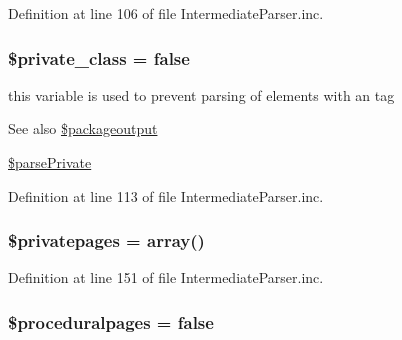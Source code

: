 \-Definition at line 106 of file \-Intermediate\-Parser.\-inc.

\hypertarget{classphp_documentor___intermediate_parser_a91bc6a84d69355cf5bf3fcae3d97df26}{
\subsubsection[{\$private\-\_\-class}]{\setlength{\rightskip}{0pt plus 5cm}\$private\-\_\-class = false}}\label{classphp_documentor___intermediate_parser_a91bc6a84d69355cf5bf3fcae3d97df26}
this variable is used to prevent parsing of elements with an  tag \begin{DoxySeeAlso}{\-See also}
\hyperlink{classphp_documentor___intermediate_parser_ae42e8e1aebbb7e9af6f8b463703e90a0}{\$packageoutput} 

\hyperlink{classphp_documentor___intermediate_parser_a351b7c7ced5d5cd6ce87029cca64d150}{\$parse\-Private} 
\end{DoxySeeAlso}


\-Definition at line 113 of file \-Intermediate\-Parser.\-inc.

\hypertarget{classphp_documentor___intermediate_parser_aca2dbbdf74f1847e4e2be72be9f5130e}{
\subsubsection[{\$privatepages}]{\setlength{\rightskip}{0pt plus 5cm}\$privatepages = array()}}\label{classphp_documentor___intermediate_parser_aca2dbbdf74f1847e4e2be72be9f5130e}


\-Definition at line 151 of file \-Intermediate\-Parser.\-inc.

\hypertarget{classphp_documentor___intermediate_parser_acc83daf92678ef7dde6bebc5560eb91e}{
\subsubsection[{\$proceduralpages}]{\setlength{\rightskip}{0pt plus 5cm}\$proceduralpages = false}}\label{classphp_documentor___intermediate_parser_acc83daf92678ef7dde6bebc5560eb91e}


